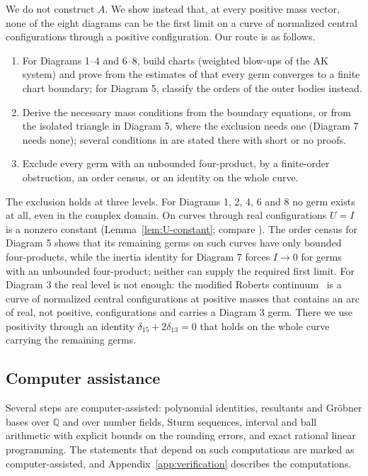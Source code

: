 \documentclass[11pt]{amsart}
\newenvironment{romanlist}{\begin{enumerate}\renewcommand{\labelenumi}{(\roman{enumi})}%
  \renewcommand{\theenumi}{\roman{enumi}}}{\end{enumerate}}
\theoremstyle{definition}
\theoremstyle{remark}
\begin{document}
We do not construct $A$.  We show instead that, at every positive mass vector, none of the eight
diagrams can be the first limit on a curve of normalized central configurations through a
positive configuration.  Our route is as follows.
\begin{romanlist}
  \item For Diagrams 1--4 and 6--8, build charts (weighted blow-ups of the AK system) and prove
  from the estimates of \cite[\S3]{AK} that every germ converges to a finite chart boundary;
  for Diagram 5, classify the orders of the outer bodies instead.
  \item Derive the necessary mass conditions from the boundary equations, or from the isolated
  triangle in Diagram 5, where the exclusion needs one (Diagram 7 needs none); several conditions
  in \cite[\S8.3--8.8]{AK} are stated there with short or no proofs.
  \item Exclude every germ with an unbounded four-product, by a finite-order obstruction, an
  order census, or an identity on the whole curve.
\end{romanlist}
The exclusion holds at three levels.  For Diagrams 1, 2, 4, 6 and 8 no germ exists at all, even
in the complex domain.  On curves through real configurations $U=I$ is a nonzero constant
(Lemma~\ref{lem:U-constant}; compare \cite[Lemma~2]{AK}).  The order census for Diagram 5
shows that its remaining germs on such curves have only bounded four-products, while the
inertia identity for Diagram 7 forces $I\to0$ for germs with an unbounded four-product; neither
can supply the required first limit.  For Diagram 3 the real level is not enough: the modified
Roberts continuum~\cite[p.~543]{AK} is a curve of normalized central configurations at positive
masses that contains an arc of real, not positive, configurations and carries a Diagram 3 germ.
There we use positivity through an identity $\delta_{15}+2\delta_{13}=0$ that holds on the whole
curve carrying the remaining germs.

\subsection*{Computer assistance}
Several steps are computer-assisted: polynomial identities, resultants and Gr\"obner bases
over $\mathbb{Q}$ and over number fields, Sturm sequences, interval and ball arithmetic with
explicit bounds on the rounding errors, and exact rational linear programming.  The statements
that depend on such computations are marked as computer-assisted, and
Appendix~\ref{app:verification} describes the computations.
\end{document}
